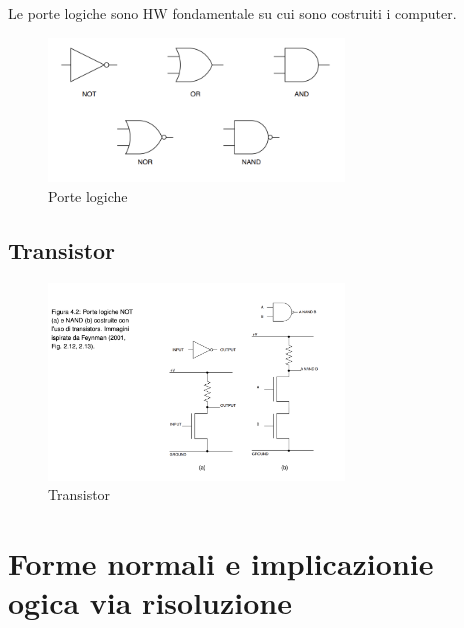 \documentclass{article}
\begin{document}
Le porte logiche sono HW fondamentale su cui sono costruiti i computer.
\begin{figure}[h!]
    \centering
    \includegraphics[width=0.7\textwidth]{porte_logiche.png}
    \caption{Porte logiche}
\end{figure}

\subsection{Transistor}
\begin{figure}[h!]
    \centering
    \includegraphics[width=0.7\textwidth]{trans.png}
    \caption{Transistor}
\end{figure}

\section{Forme normali e implicazionie ogica via risoluzione}
\end{document}
